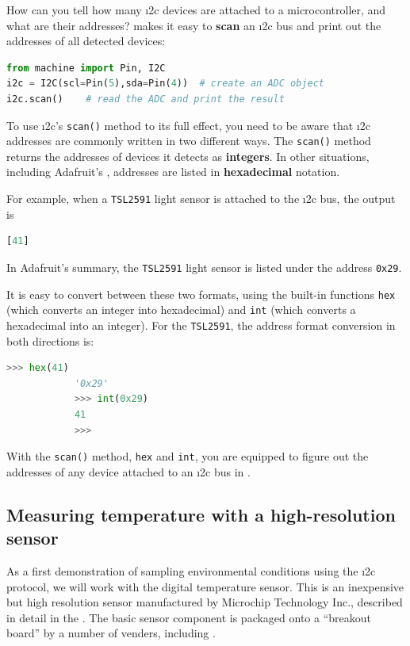	\begin{kaobox}[frametitle=Addressing the part!]How can you tell how many \i2c devices are attached to a microcontroller, and what are their addresses?
  \Micropython makes it easy to \textbf{scan} an \i2c bus and print out the addresses of all detected devices:
			\begin{lstlisting}[language=Python]
from machine import Pin, I2C
i2c = I2C(scl=Pin(5),sda=Pin(4))  # create an ADC object
i2c.scan()    # read the ADC and print the result\end{lstlisting}

		\smallskip
		To use \i2c's \lstinline{scan()} method to its full effect, you need to be aware that \i2c addresses are commonly written in two different ways.
		The \lstinline{scan()} method returns the addresses of devices it detects as \textbf{integers}.
		In other situations, including Adafruit's , addresses are listed in \textbf{hexadecimal} notation.

		For example, when a \texttt{TSL2591} light sensor is attached to the \i2c bus, the output is
    \begin{lstlisting}[language=Python]
[41]\end{lstlisting}
    In Adafruit's summary, the \texttt{TSL2591} light sensor is listed under the address \lstinline{0x29}.

		\smallskip
		It is easy to convert between these two formats, using the built-in functions \lstinline{hex} (which converts an integer into hexadecimal) and \lstinline{int} (which converts a hexadecimal into an integer).
		For the \texttt{TSL2591}, the address format conversion in both directions is:
    \begin{lstlisting}[language=Python]
			>>> hex(41)
			'0x29'
			>>> int(0x29)
			41
			>>>\end{lstlisting}
    With the \lstinline{scan()} method, \lstinline{hex} and \lstinline{int}, you are equipped to figure out the addresses of any device attached to an \i2c bus in \Micropython.
	\end{kaobox}

\subsection{ Measuring temperature with a high-resolution sensor }
As a first demonstration of sampling environmental conditions using the \i2c protocol, we will work with the  digital temperature sensor.
This is an inexpensive but high resolution sensor manufactured by Microchip Technology Inc., described in detail in the .
The basic sensor component is packaged onto a ``breakout board'' by a number of venders, including .

